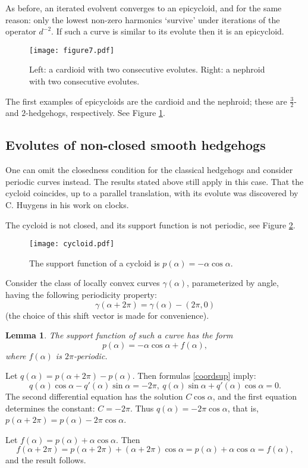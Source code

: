 \documentclass[12pt]{article}
\makeatletter
\newtheorem{lemma}{Lemma}[section]
\renewenvironment{proof}[1][\proofname] 
{\par\pushQED{\qed}\normalfont\topsep6\p@\@plus6\p@\relax\trivlist\item[\hskip\labelsep\bfseries#1\@addpunct{.}]\ignorespaces}{\popQED\endtrivlist\@endpefalse}
\makeatother
\begin{document}
As before, an iterated evolvent converges to an epicycloid, and for the same reason: only the lowest non-zero harmonics `survive' under iterations of  the operator $d^{-2}$. If such a curve is similar to its evolute then it is an epicycloid. 

\begin{figure}[hbtp]
\centering
\texttt{[image: figure7.pdf]}
\caption{Left: a cardioid with two consecutive evolutes. Right: a nephroid with two consecutive evolutes.}
\label{nephroid}
\end{figure}

The first examples of epicycloids are the cardioid and the nephroid; these are $\frac32$- and $2$-hedgehogs, respectively. See Figure \ref{nephroid}.

\subsection{Evolutes of non-closed smooth hedgehogs}
One can omit the closedness condition for the classical hedgehogs and consider periodic curves instead. The results stated above still apply in this case. That the cycloid coincides, up to a parallel translation, with its evolute was discovered by C. Huygens in his work on clocks. 

The cycloid is not closed, and its support function is not periodic, see Figure \ref{cycloid}.

\begin{figure}[hbtp]
	\centering
	\texttt{[image: cycloid.pdf]}
	\caption{The support function of a cycloid is $p(\alpha)=-\alpha 
		\cos\alpha$.}
	\label{cycloid}
\end{figure}

Consider the class of locally convex curves $\gamma(\alpha)$, parameterized by angle, having the following periodicity property: $$\gamma(\alpha+2\pi)=\gamma(\alpha) -(2\pi,0)$$(the choice of this shift vector is made for convenience).

\begin{lemma}
\label{cyclshift}
The support function of such a curve has the form
\begin{equation}
\label{suppform}
p(\alpha)=-\alpha \cos\alpha + f(\alpha),
\end{equation}
where $f(\alpha)$ is $2\pi$-periodic.
\end{lemma}

\begin{proof}
Let $q(\alpha)=p(\alpha+2\pi)-p(\alpha)$. Then formulas \eqref{coordsup} imply:
$$q(\alpha) \cos\alpha - q'(\alpha) \sin\alpha = -2\pi,\ q(\alpha) \sin\alpha + q'(\alpha) \cos\alpha = 0.$$
The second differential equation has the solution $C \cos\alpha$, and the first equation determines the constant: $C=-2\pi$. Thus $q(\alpha)=-2\pi \cos\alpha$, that is, $p(\alpha+2\pi)=p(\alpha) -2\pi \cos\alpha$.
	
Let $f(\alpha)=p(\alpha) + \alpha \cos\alpha$. Then
$$f(\alpha+2\pi)=p(\alpha+2\pi) + (\alpha+2\pi) \cos\alpha = p(\alpha) + \alpha \cos\alpha=f(\alpha),
$$
and the result follows.
\end{proof}
\end{document}
